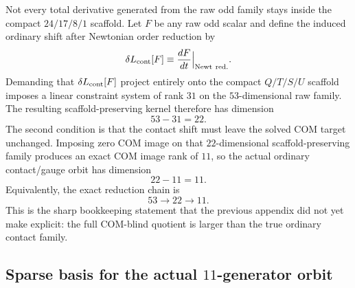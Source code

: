 \documentclass[11pt]{article}
\begin{document}
Not every total derivative generated from the raw odd family stays inside the
compact $24/17/8/1$ scaffold.  Let $F$ be any raw odd scalar and define the
induced ordinary shift after Newtonian order reduction by
\begin{equation}
\delta L_{\rm cont}[F]
\equiv
\frac{dF}{dt}\Big|_{\rm Newt\ red.}.
\label{eq:app-gauge-orbit-dFdt}
\end{equation}
Demanding that $\delta L_{\rm cont}[F]$ project entirely onto the compact
$Q/T/S/U$ scaffold imposes a linear constraint system of rank $31$ on the
$53$-dimensional raw family.  The resulting scaffold-preserving kernel therefore
has dimension
\begin{equation}
\boxed{53-31=22.}
\label{eq:app-gauge-orbit-scaffold-kernel}
\end{equation}
The second condition is that the contact shift must leave the solved COM target
unchanged.  Imposing zero COM image on that $22$-dimensional scaffold-preserving
family produces an exact COM image rank of $11$, so the actual ordinary
contact/gauge orbit has dimension
\begin{equation}
\boxed{22-11=11.}
\label{eq:app-gauge-orbit-contact-dim}
\end{equation}
Equivalently, the exact reduction chain is
\begin{equation}
\boxed{53\longrightarrow 22\longrightarrow 11.}
\label{eq:app-gauge-orbit-dimension-chain}
\end{equation}
This is the sharp bookkeeping statement that the previous appendix did not yet
make explicit: the full COM-blind quotient is larger than the true ordinary
contact family.

\subsection{Sparse basis for the actual \texorpdfstring{$11$}{11}-generator orbit}
\label{app:gauge-orbit-basis}
\end{document}
